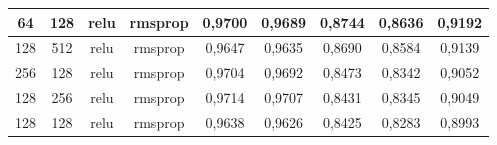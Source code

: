 \begin{table}[H]
{\begin{tabular}{|c|c|c|c|c|c|c|c|c|}
				64                                                                    & 128                                                            & relu                & rmsprop                & 0,9700                                                                 & 0,9689                                                              & 0,8744                                                                            & 0,8636                                                                         & 0,9192                                                               \\ \hline
				128                                                                   & 512                                                            & relu                & rmsprop                & 0,9647                                                                 & 0,9635                                                              & 0,8690                                                                            & 0,8584                                                                         & 0,9139                                                               \\ \hline
				256                                                                   & 128                                                            & relu                & rmsprop                & 0,9704                                                                 & 0,9692                                                              & 0,8473                                                                            & 0,8342                                                                         & 0,9052                                                               \\ \hline
				128                                                                   & 256                                                            & relu                & rmsprop                & 0,9714                                                                 & 0,9707                                                              & 0,8431                                                                            & 0,8345                                                                         & 0,9049                                                               \\ \hline
				128                                                                   & 128                                                            & relu                & rmsprop                & 0,9638                                                                 & 0,9626                                                              & 0,8425                                                                            & 0,8283                                                                         & 0,8993                                                               \\ \hline

\end{tabular}}
\end{table}
